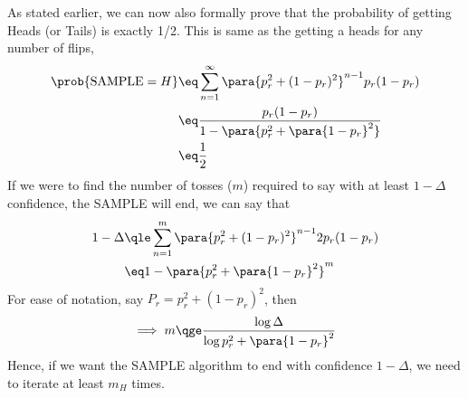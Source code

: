 \documentclass[a4paper,10pt]{article}
\begin{document}
\begin{question}
	As stated earlier, we can now also formally prove that the probability of getting Heads (or Tails) is exactly 1/2. This is same as the getting a heads for any number of flips, \ie
	\begin{align*}
		\prob{\text{SAMPLE} = H}	&\eq	\sum_{n = 1}^{\infty} \para{p_r^2 + (1 - p_r)^2}^{n - 1} p_r (1 - p_r) \\
		&\eq	\frac{p_r (1 - p_r)}{1 - \para{p_r^2 + \para{1 - p_r}^2}} \\
		&\eq	\frac{1}{2}
	\end{align*}
	If we were to find the number of tosses ($m$) required to say with at least $1 - \Delta$ confidence, the SAMPLE will end, we can say that
	\begin{align*}
		1 - \Delta	&\qle	\sum_{n = 1}^{m} \para{p_r^2 + (1 - p_r)^2}^{n - 1} 2 p_r (1 - p_r) \\
		&\eq	1 - \para{p_r^2 + \para{1 - p_r}^2}^m
	\end{align*}
	For ease of notation, say $P_r = p_r^2 + (1 - p_r)^2$, then
		\begin{align*}
			\implies m	&\qge	\frac{\log{\Delta}}{\log{p_r^2 + \para{1 - p_r}^2}} \\
		\end{align*}
	Hence, if we want the SAMPLE algorithm to end with confidence $1 - \Delta$, we need to iterate at least $m_H$ times.

\end{question}
\end{document}
